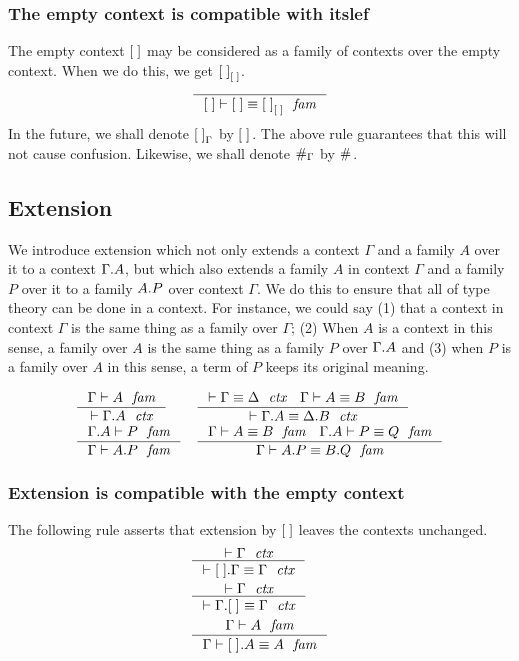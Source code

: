 \subsubsection{The empty context is compatible with itslef}
The empty context $\emptyc$ may be considered as a family of contexts over the empty
context. When we do this, we get $\emptyf[\emptyc]$.
\begin{equation}
\inference
{}
{\jfameq{\emptyc}{\emptyc}{\emptyf[\emptyc]}}
\end{equation}
In the future, we shall denote $\emptyf[\Gamma]$ by $\emptyf$. The above rule
guarantees that this will not cause confusion. Likewise, we shall denote
$\emptytm[\Gamma]$ by $\emptytm$.

\subsection{Extension}
We introduce extension which not only extends a context $\Gamma$ and a family
$A$ over it to a context $\ctxext{\Gamma}{A}$, but which also extends a family $A$
in context $\Gamma$ and a family $P$ over it to a family $\ctxext{A}{P}$ over context
$\Gamma$. We do this to ensure that all of type theory can be done in a context.
For instance, we could say (1) that a context in context $\Gamma$ is the same thing
as a family over $\Gamma$; (2) When $A$ is a context in this sense, a family over
$A$ is the same thing as a family $P$ over $\ctxext{\Gamma}{A}$ and 
(3) when $P$ is a family over $A$ in this sense, a term of $P$ keeps its original meaning.

\begin{align}
& \inference
  {\jfam{\Gamma}{A}}
  {\jctx{\ctxext{\Gamma}{A}}}
& & \inference
    {\jctxeq{\Gamma}{\Delta}
     \jfameq{\Gamma}{A}{B}}
    {\jctxeq{\ctxext{\Gamma}{A}}{\ctxext{\Delta}{B}}}\\
& \inference
  {\jfam{{\Gamma}{A}}{P}}
  {\jfam{\Gamma}{\ctxext{A}{P}}}
& & \inference
    {\jfameq{\Gamma}{A}{B} 
     \jfameq{{\Gamma}{A}}{P}{Q}}
    {\jfameq{\Gamma}{\ctxext{A}{P}}{\ctxext{B}{Q}}}
\end{align}

\subsubsection{Extension is compatible with the empty context}
The following rule asserts that extension by $\emptyc$ leaves the contexts unchanged.
\begin{align}
& \inference
  {\jctx{\Gamma}}
  {\jctxeq{\ctxext{\emptyc}{\Gamma}}{\Gamma}}\\
& \inference
  {\jctx{\Gamma}}
  {\jctxeq{\ctxext{\Gamma}{\emptyf}}{\Gamma}}\\
& \inference
  {\jfam{\Gamma}{A}}
  {\jfameq{\Gamma}{\ctxext{\emptyf}{A}}{A}}
\end{align}

